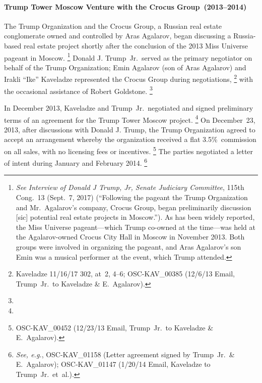 \paragraph{Trump Tower Moscow Venture with the Crocus Group~(2013--2014)}

The Trump Organization and the Crocus Group, a Russian real estate conglomerate owned and controlled by Aras Agalarov, began discussing a Russia-based real estate project shortly after the conclusion of the 2013 Miss Universe pageant in Moscow.%
\footnote{\textit{See Interview of Donald J Trump, Jr, Senate Judiciary Committee}, 115th Cong.~13 (Sept.~7, 2017) (``Following the pageant the Trump Organization and Mr.~Agalarov's company, Crocus Group, began preliminarily discussion [sic] potential real estate projects in Moscow.'').
As has been widely reported, the Miss Universe pageant---which Trump co-owned at the time---was held at the Agalarov-owned Crocus City Hall in Moscow in November
2013. Both groups were involved in organizing the pageant, and Aras Agalarov's son Emin was a musical performer at the event, which Trump attended.}
Donald J. Trump~Jr.\ served as the primary negotiator on behalf of the Trump Organization; Emin Agalarov (son of Aras Agalarov) and Irakli ``Ike'' Kaveladze represented the Crocus Group during negotiations,%
\footnote{Kaveladze 11/16/17 302, at~2, 4--6;  OSC-KAV\_00385 (12/6/13 Email, Trump~Jr.\ to Kaveladze \& E.~Agalarov).}
with the occasional assistance of Robert Goldstone.%
\footnote{}

In December 2013, Kaveladze and Trump~Jr.\ negotiated and signed preliminary terms of an agreement for the Trump Tower Moscow project.%
\footnote{}
On December~23, 2013, after discussions with Donald J. Trump, the Trump Organization agreed to accept an arrangement whereby the organization received a flat 3.5\%~commission on all sales, with no licensing fees or incentives.%
\footnote{OSC-KAV\_00452 (12/23/13 Email, Trump~Jr.\ to Kaveladze \& E.~Agalarov).}
The parties negotiated a letter of intent during January and February 2014.%
\footnote{\textit{See, e.g.}, OSC-KAV\_01158 (Letter agreement signed by Trump~Jr.\ \& E.~Agalarov); OSC-KAV\_01147 (1/20/14 Email, Kaveladze to Trump~Jr.\ et~al.).}

